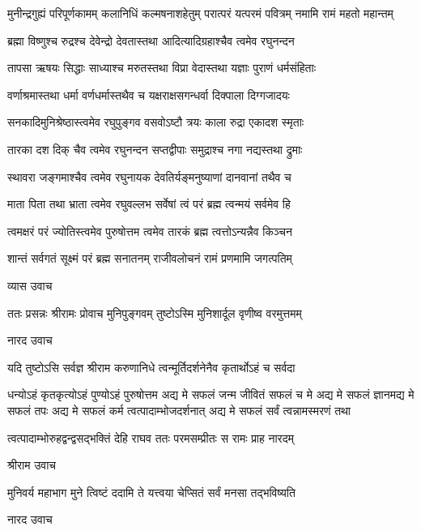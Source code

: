 \fourlineindentedshloka
{मुनीन्द्रगुह्यं परिपूर्णकामम्} 
{कलानिधिं कल्मषनाशहेतुम्}
{परात्परं यत्परमं पवित्रम्}
{नमामि रामं महतो महान्तम्}%

\twolineshloka
{ब्रह्मा विष्णुश्च रुद्रश्च देवेन्द्रो देवतास्तथा}
{आदित्यादिग्रहाश्चैव त्वमेव रघुनन्दन}%

\twolineshloka
{तापसा ऋषयः सिद्धाः साध्याश्च मरुतस्तथा}
{विप्रा वेदास्तथा यज्ञाः पुराणं धर्मसंहिताः}%

\twolineshloka
{वर्णाश्रमास्तथा धर्मा वर्णधर्मास्तथैव च}
{यक्षराक्षसगन्धर्वा दिक्पाला दिग्गजादयः}%

\twolineshloka
{सनकादिमुनिश्रेष्ठास्त्वमेव रघुपुङ्गव}
{वसवोऽष्टौ त्रयः काला रुद्रा एकादश स्मृताः}%

\twolineshloka
{तारका दश दिक् चैव त्वमेव रघुनन्दन}
{सप्तद्वीपाः समुद्राश्च नगा नद्यस्तथा द्रुमाः}%

\twolineshloka
{स्थावरा जङ्गमाश्चैव त्वमेव रघुनायक}
{देवतिर्यङ्मनुष्याणां दानवानां तथैव च}%

\twolineshloka
{माता पिता तथा भ्राता त्वमेव रघुवल्लभ}
{सर्वेषां त्वं परं ब्रह्म त्वन्मयं सर्वमेव हि}%

\twolineshloka
{त्वमक्षरं परं ज्योतिस्त्वमेव पुरुषोत्तम}
{त्वमेव तारकं ब्रह्म त्वत्तोऽन्यन्नैव किञ्चन}%

\twolineshloka
{शान्तं सर्वगतं सूक्ष्मं परं ब्रह्म सनातनम्}
{राजीवलोचनं रामं प्रणमामि जगत्पतिम्}%

व्यास उवाच

\twolineshloka
{ततः प्रसन्नः श्रीरामः प्रोवाच मुनिपुङ्गवम्}
{तुष्टोऽस्मि मुनिशार्दूल वृणीष्व वरमुत्तमम्}%

नारद उवाच

\twolineshloka
{यदि तुष्टोऽसि सर्वज्ञ श्रीराम करुणानिधे}
{त्वन्मूर्तिदर्शनेनैव कृतार्थोऽहं च सर्वदा}%

\threelineshloka
{धन्योऽहं कृतकृत्योऽहं पुण्योऽहं पुरुषोत्तम}
{अद्य मे सफलं जन्म जीवितं सफलं च मे}%
{अद्य मे सफलं ज्ञानमद्य मे सफलं तपः}
\twolineshloka
{अद्य मे सफलं कर्म त्वत्पादाम्भोजदर्शनात्}
{अद्य मे सफलं सर्वं त्वन्नामस्मरणं तथा}%

\twolineshloka
{त्वत्पादाम्भोरुहद्वन्द्वसद्भक्तिं देहि राघव}
{ततः परमसम्प्रीतः स रामः प्राह नारदम्}%

श्रीराम उवाच

\twolineshloka
{मुनिवर्य महाभाग मुने त्विष्टं ददामि ते}
{यत्त्वया चेप्सितं सर्वं मनसा तद्भविष्यति}%

नारद उवाच\nopagebreak[4]

